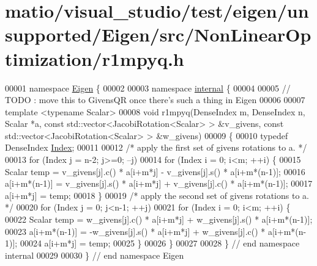 \hypertarget{matio_2visual__studio_2test_2eigen_2unsupported_2_eigen_2src_2_non_linear_optimization_2r1mpyq_8h_source}{}\section{matio/visual\+\_\+studio/test/eigen/unsupported/\+Eigen/src/\+Non\+Linear\+Optimization/r1mpyq.h}
\label{matio_2visual__studio_2test_2eigen_2unsupported_2_eigen_2src_2_non_linear_optimization_2r1mpyq_8h_source}

\begin{DoxyCode}
00001 \textcolor{keyword}{namespace }\hyperlink{namespace_eigen}{Eigen} \{ 
00002 
00003 \textcolor{keyword}{namespace }\hyperlink{namespaceinternal}{internal} \{
00004 
00005 \textcolor{comment}{// TODO : move this to GivensQR once there's such a thing in Eigen}
00006 
00007 \textcolor{keyword}{template} <\textcolor{keyword}{typename} Scalar>
00008 \textcolor{keywordtype}{void} r1mpyq(DenseIndex m, DenseIndex n, Scalar *a, \textcolor{keyword}{const} std::vector<JacobiRotation<Scalar> > &v\_givens, \textcolor{keyword}{
      const} std::vector<JacobiRotation<Scalar> > &w\_givens)
00009 \{
00010     \textcolor{keyword}{typedef} DenseIndex \hyperlink{namespace_eigen_a62e77e0933482dafde8fe197d9a2cfde}{Index};
00011 
00012     \textcolor{comment}{/*     apply the first set of givens rotations to a. */}
00013     \textcolor{keywordflow}{for} (Index j = n-2; j>=0; --j)
00014         \textcolor{keywordflow}{for} (Index i = 0; i<m; ++i) \{
00015             Scalar temp = v\_givens[j].c() * a[i+m*j] - v\_givens[j].s() * a[i+m*(n-1)];
00016             a[i+m*(n-1)] = v\_givens[j].s() * a[i+m*j] + v\_givens[j].c() * a[i+m*(n-1)];
00017             a[i+m*j] = temp;
00018         \}
00019     \textcolor{comment}{/*     apply the second set of givens rotations to a. */}
00020     \textcolor{keywordflow}{for} (Index j = 0; j<n-1; ++j)
00021         \textcolor{keywordflow}{for} (Index i = 0; i<m; ++i) \{
00022             Scalar temp = w\_givens[j].c() * a[i+m*j] + w\_givens[j].s() * a[i+m*(n-1)];
00023             a[i+m*(n-1)] = -w\_givens[j].s() * a[i+m*j] + w\_givens[j].c() * a[i+m*(n-1)];
00024             a[i+m*j] = temp;
00025         \}
00026 \}
00027 
00028 \} \textcolor{comment}{// end namespace internal}
00029 
00030 \} \textcolor{comment}{// end namespace Eigen}
\end{DoxyCode}
